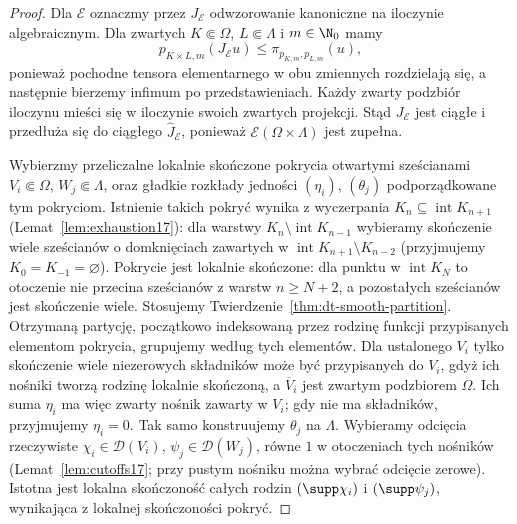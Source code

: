 \begin{proof}
Dla $\mathcal E$ oznaczmy przez $J_{\mathcal E}$
odwzorowanie kanoniczne na iloczynie algebraicznym.
Dla zwartych $K\Subset\Omega$, $L\Subset\Lambda$
i $m\in\N_0$ mamy
\[
 p_{K\times L,m}(J_{\mathcal E}u)
 \le\pi_{p_{K,m},p_{L,m}}(u),
\]
ponieważ pochodne tensora elementarnego w obu zmiennych
rozdzielają się, a następnie bierzemy infimum
po przedstawieniach. Każdy zwarty podzbiór iloczynu
mieści się w iloczynie swoich zwartych projekcji.
Stąd $J_{\mathcal E}$ jest ciągłe i przedłuża się
do ciągłego $\widehat J_{\mathcal E}$, ponieważ
$\mathcal E(\Omega\times\Lambda)$ jest zupełna.

Wybierzmy przeliczalne lokalnie skończone pokrycia
otwartymi sześcianami $V_i\Subset\Omega$,
$W_j\Subset\Lambda$, oraz gładkie rozkłady jedności
$(\eta_i)$, $(\theta_j)$ podporządkowane tym pokryciom.
Istnienie takich pokryć wynika z wyczerpania
$K_n\subseteq\operatorname{int}K_{n+1}$
(Lemat~\ref{lem:exhaustion17}):
dla warstwy $K_n\setminus\operatorname{int}K_{n-1}$
wybieramy skończenie wiele sześcianów o domknięciach
zawartych w $\operatorname{int}K_{n+1}\setminus K_{n-2}$
(przyjmujemy $K_0=K_{-1}=\varnothing$).
Pokrycie jest lokalnie skończone: dla punktu
w $\operatorname{int}K_N$ to otoczenie nie przecina
sześcianów z warstw $n\ge N+2$, a pozostałych
sześcianów jest skończenie wiele.
Stosujemy Twierdzenie~\ref{thm:dt-smooth-partition}.
Otrzymaną partycję, początkowo indeksowaną przez
rodzinę funkcji przypisanych elementom pokrycia,
grupujemy według tych elementów. Dla ustalonego $V_i$
tylko skończenie wiele niezerowych składników może
być przypisanych do $V_i$, gdyż ich nośniki tworzą
rodzinę lokalnie skończoną, a $\overline V_i$ jest
zwartym podzbiorem $\Omega$. Ich suma $\eta_i$ ma
więc zwarty nośnik zawarty w $V_i$; gdy nie ma
składników, przyjmujemy $\eta_i=0$. Tak samo
konstruujemy $\theta_j$ na $\Lambda$.
Wybieramy odcięcia rzeczywiste
$\chi_i\in\mathcal D(V_i)$, $\psi_j\in\mathcal D(W_j)$,
równe $1$ w otoczeniach tych nośników
(Lemat~\ref{lem:cutoffs17}; przy pustym nośniku
można wybrać odcięcie zerowe).
Istotna jest lokalna skończoność całych rodzin
$(\supp\chi_i)$ i $(\supp\psi_j)$, wynikająca
z lokalnej skończoności pokryć.


\end{proof}
